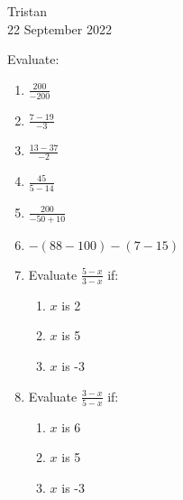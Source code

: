 \documentclass[14pt]{extarticle} %
\begin{document}
\hfill Tristan\\
\null\hfill 22 September 2022

\vspace{10mm}

Evaluate:
\begin{enumerate}[label=\Alph*.), itemsep=\fill]
\item  $\frac{200}{-200}$
\item  $\frac{7-19}{-3}$
\item  $\frac{13-37}{-2}$
\item  $\frac{45}{5-14}$
\item  $\frac{200}{-50+10}$
\vfill\clearpage
\item  $-(88-100)-(7-15)$
\item Evaluate $\frac{5-x}{3-x}$ if:
    \begin{enumerate}[itemsep=\fill]
    \item $x$ is 2
    \item $x$ is 5
    \item $x$ is -3
    \vfill\end{enumerate}
\item Evaluate $\frac{3-x}{5-x}$ if:
    \begin{enumerate}[itemsep=\fill]
    \item $x$ is 6
    \item $x$ is 5
    \item $x$ is -3
    \end{enumerate}
\vfill\end{enumerate}
\end{document}
